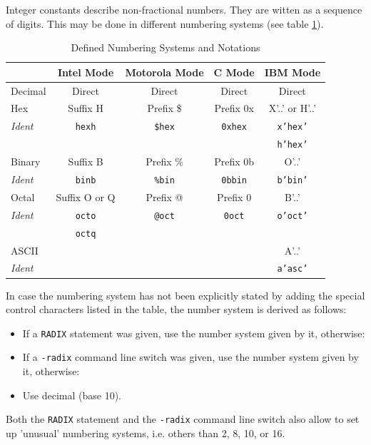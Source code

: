 \documentclass[12pt,twoside]{report}
\newcommand{\ii}[1]{{\it #1}}
\newcommand{\tty}[1]{{\tt #1}}
\begin{document}
Integer constants describe non-fractional numbers.  They are witten as a
sequence of digits.  This may be done in different numbering systems (see
table \ref{TabSystems}).
\par
\begin{table}[htb]
\begin{center}\begin{tabular}{|l|c|c|c|c|}
\hline
          & Intel Mode    & Motorola Mode & C Mode    & IBM Mode \\
\hline
\hline
Decimal   & Direct        & Direct      & Direct      & Direct \\
Hex       & Suffix H      & Prefix \$   & Prefix 0x   & X'..' or H'..' \\
\ii{Ident}& \tty{hexh}    & \tty{\$hex} & \tty{0xhex} & \tty{x'hex'} \\
          &               &             &             & \tty{h'hex'} \\
Binary    & Suffix B      & Prefix \%   & Prefix 0b   & O'..' \\
\ii{Ident}& \tty{binb}    & \tty{\%bin} & \tty{0bbin} & \tty{b'bin'} \\
Octal     & Suffix O or Q & Prefix @    & Prefix 0    & B'..' \\
\ii{Ident}& \tty{octo}    & \tty{@oct}  & \tty{0oct}  & \tty{o'oct'} \\  
          & \tty{octq}    &             &             & \\
ASCII     &               &             &             & A'..' \\
\ii{Ident}&               &             &             & \tty{a'asc'} \\
\hline
\end{tabular}\end{center}
\caption{Defined Numbering Systems and Notations\label{TabSystems}}
\end{table}
In case the numbering system has not been explicitly stated by adding the
special control characters listed in the table, the number system
is derived as follows:
\begin{itemize}
\item{If a {\tt RADIX} statement was given, use the number system
      given by it, otherwise:}
\item{If a {\tt -radix} command line switch was given, use the number
      system given by it, otherwise:}
\item{Use decimal (base 10).}
\end{itemize}
Both the {\tt RADIX} statement and the  {\tt -radix} command line switch
also allow to set up 'unusual' numbering systems, i.e. others than 2, 8, 10,
or 16.
\end{document}
